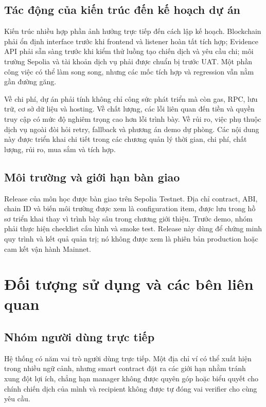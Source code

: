 \subsection{Tác động của kiến trúc đến kế hoạch dự án}

Kiến trúc nhiều hợp phần ảnh hưởng trực tiếp đến cách lập kế hoạch. Blockchain phải ổn định interface trước khi frontend và listener hoàn tất tích hợp; Evidence API phải sẵn sàng trước khi kiểm thử luồng tạo chiến dịch và yêu cầu chi; môi trường Sepolia và tài khoản dịch vụ phải được chuẩn bị trước UAT. Một phần công việc có thể làm song song, nhưng các mốc tích hợp và regression vẫn nằm gần đường găng.

Về chi phí, dự án phải tính không chỉ công sức phát triển mà còn gas, RPC, lưu trữ, cơ sở dữ liệu và hosting. Về chất lượng, các lỗi liên quan đến tiền và quyền truy cập có mức độ nghiêm trọng cao hơn lỗi trình bày. Về rủi ro, việc phụ thuộc dịch vụ ngoài đòi hỏi retry, fallback và phương án demo dự phòng. Các nội dung này được triển khai chi tiết trong các chương quản lý thời gian, chi phí, chất lượng, rủi ro, mua sắm và tích hợp.

\subsection{Môi trường và giới hạn bàn giao}

Release của môn học được bàn giao trên Sepolia Testnet. Địa chỉ contract, ABI, chain ID và biến môi trường được xem là configuration item, được lưu trong hồ sơ triển khai thay vì trình bày sâu trong chương giới thiệu. Trước demo, nhóm phải thực hiện checklist cấu hình và smoke test. Release này dùng để chứng minh quy trình và kết quả quản trị; nó không được xem là phiên bản production hoặc cam kết vận hành Mainnet.

\section{Đối tượng sử dụng và các bên liên quan}

\subsection{Nhóm người dùng trực tiếp}

Hệ thống có năm vai trò người dùng trực tiếp. Một địa chỉ ví có thể xuất hiện trong nhiều ngữ cảnh, nhưng smart contract đặt ra các giới hạn nhằm tránh xung đột lợi ích, chẳng hạn manager không được quyên góp hoặc biểu quyết cho chính chiến dịch của mình và recipient không được tự đóng vai verifier cho cùng yêu cầu.

